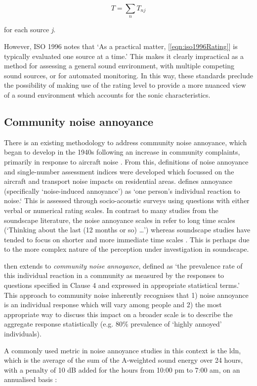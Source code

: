 $$
T = \sum_n T_{nj}
$$

for each source \emph{j}.

However, ISO 1996 notes that `As a practical matter, [\cref{eqn:iso1996Rating}] is typically evaluated one source at a time.' This makes it clearly impractical as a method for assessing a general sound environment, with multiple competing sound sources, or for automated monitoring. In this way, these standards preclude the possibility of making use of the rating level to provide a more nuanced view of a sound environment which accounts for the sonic characteristics. 

\subsection{Community noise annoyance}
There is an existing methodology to address community noise annoyance, which began to develop in the 1940s following an increase in community complaints, primarily in response to aircraft noise \citep{Kryter1994}\footnotemark{}. From this, definitions of noise annoyance and single-number assessment indices were developed which focussed on the aircraft and transport noise impacts on residential areas. \citet{ISO15666} defines annoyance (specifically `noise-induced annoyance') as `one person's individual reaction to noise.` This is assessed through socio-acoustic surveys using questions with either verbal or numerical rating scales. In contrast to many studies from the soundscape literature, the noise annoyance scales in \citet{ISO15666} refer to long time scales (`Thinking about the last (12 months or so) \ldots') whereas soundscape studies have tended to focus on shorter and more immediate time scales \citep{Yang2013Psychoacoustical,Rychtarikova2013Soundscape}. This is perhaps due to the more complex nature of the perception under investigation in soundscape. 

\citet{ISO15666} then extends to \emph{community noise annoyance}, defined as `the prevalence rate of this individual reaction in a community as measured by the responses to questions specified in Clause 4 and expressed in appropriate statistical terms.' This approach to community noise inherently recognises that 1) noise annoyance is an individual response which will vary among people and 2) the most appropriate way to discuss this impact on a broader scale is to describe the aggregate response statistically (e.g. 80\% prevalence of `highly annoyed' individuals).

A commonly used metric in noise annoyance studies in this context is the \gls{ldn}, which is the average of the sum of the A-weighted sound energy over 24 hours, with a penalty of 10 dB added for the hours from 10:00 pm to 7:00 am, on an annualised basis \citep[pg. 571]{Kryter1994}:

